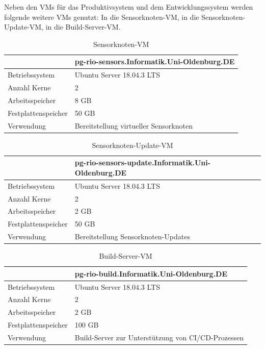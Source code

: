 Neben den VMs für das Produktivsystem und dem Entwicklungssystem werden folgende weitere VMs genutzt:
In  die Sensorknoten-VM,
in  die Sensorknoten-Update-VM,
in  die Build-Server-VM.\par\bigskip
\begin{table}[H]\caption{Sensorknoten-VM}\label{tbl:vmsen}
\begin{tabularx}{\textwidth}{|l|X|}
	\hline
	&  \textbf{pg-rio-sensors.Informatik.Uni-Oldenburg.DE}\\ 
	\hline Betriebssystem
	&  Ubuntu Server 18.04.3 LTS\\ 
	\hline Anzahl Kerne
	&  2\\ 
	\hline Arbeitsspeicher 
	&  8 GB\\ 
	\hline Festplattenspeicher
	&  50 GB\\ 
	\hline Verwendung 
	&  Bereitstellung virtueller Sensorknoten\\ 
	\hline 
\end{tabularx}
\end{table}
\par\bigskip

\begin{table}[H]\caption{Sensorknoten-Update-VM}\label{tbl:vmsenup}
\begin{tabularx}{\textwidth}{|l|X|}
	\hline
	&  \textbf{pg-rio-sensors-update.Informatik.Uni-Oldenburg.DE}\\ 
	\hline Betriebssystem
	&  Ubuntu Server 18.04.3 LTS\\ 
	\hline Anzahl Kerne
	&  2\\ 
	\hline Arbeitsspeicher 
	&  2 GB\\ 
	\hline Festplattenspeicher
	&  50 GB\\ 
	\hline Verwendung 
	&  Bereitstellung Sensorknoten-Updates\\ 
	\hline 
\end{tabularx}
\end{table} 
\par\bigskip

\begin{table}[H]\caption{Build-Server-VM}\label{tbl:vmbuild}
\begin{tabularx}{\textwidth}{|l|X|}
	\hline
	&  \textbf{pg-rio-build.Informatik.Uni-Oldenburg.DE}\\ 
	\hline Betriebssystem
	&  Ubuntu Server 18.04.3 LTS\\ 
	\hline Anzahl Kerne
	&  2\\ 
	\hline Arbeitsspeicher 
	&  2 GB\\ 
	\hline Festplattenspeicher
	&  100 GB\\ 
	\hline Verwendung 
	&  Build-Server zur Unterstützung von CI/CD-Prozessen\\ 
	\hline 
\end{tabularx}
\end{table} 
\par\bigskip

